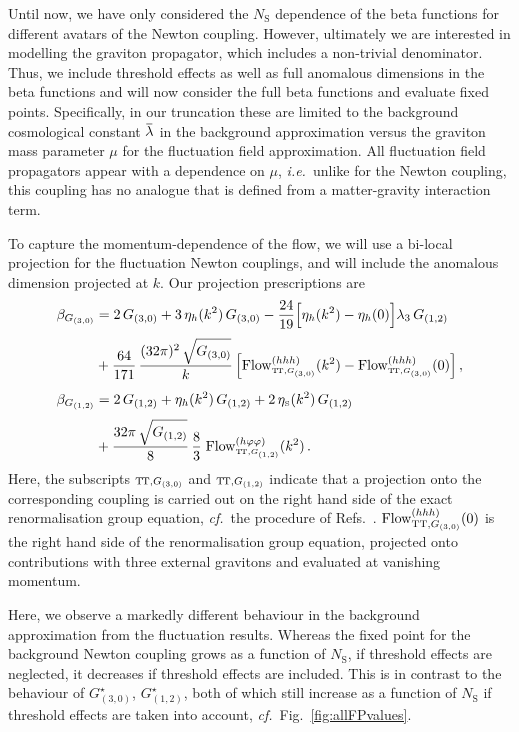 \documentclass[11pt]{book}
\newcommand{\overbar}[1]{\mkern 1.5mu\overline{\mkern-1.5mu#1\mkern-1.5mu}\mkern 1.5mu}
\newcommand\TTspace{ -1pt }
\newcommand\TT{ \scriptscriptstyle{\mathrm{T\hspace{\TTspace}T}} }
\newcommand\etaS{ \eta_{\scriptscriptstyle{\mathrm{S}}} }
\newcommand\NS{ N_{\scriptscriptstyle{\mathrm{S}}} }
\newcommand{\Flow}{\mathrm{Flow}}
\newcommand\ie{\textit{i.e.}\ }
\newcommand\cf{\textit{cf.}\ }
\numberwithin{equation}{chapter}
\begin{document}
Until now, we have only considered the $\NS$ dependence of the beta functions for different
avatars of the Newton coupling. However, ultimately we are interested in modelling the graviton propagator,
which includes a non-trivial denominator.
Thus, we include threshold effects as well as full anomalous dimensions in the beta functions and will
now consider the full beta functions and evaluate fixed points.
Specifically, in our truncation these are limited to the background cosmological constant $\overbar{\lambda}$
in the background approximation versus the graviton mass parameter $\mu$ for the fluctuation field
approximation.
All fluctuation field propagators appear with a dependence on $\mu$, \ie unlike for the Newton coupling,
this coupling has no analogue that is defined from a matter-gravity interaction term.

To capture the momentum-dependence of the flow, we will use a bi-local projection for the fluctuation Newton couplings, and will include the anomalous dimension projected at $k$.
Our projection prescriptions are
\begin{align}
  \beta_{G_{(3,0)}} &= 2 \, G_{(3,0)} + 3  \, \eta_h(k^2)  \, G_{(3,0)}
  - \frac{24}{19}
  \Big[
    \eta_h(k^2)
    -\eta_h(0)
  \Big]
  \lambda_3 \, G_{(1,2)}
  \nonumber \\[3pt]
  &+ \frac{64}{171} \, \frac{ (32\pi)^2 \, \sqrt{ \vphantom{G^2} G_{(3,0)} } }{ k }
  \left[
    \Flow^{(hhh)}_{ \TT, G_{(3,0)} }(k^2)-
    \Flow^{(hhh)}_{ \TT, G_{(3,0)} }(0)
  \right] ,
  \\[5pt]
  \beta_{G_{(1,2)}} &= 2 \, G_{(1,2)} + \eta_h(k^2) \, G_{(1,2)} + 2 \, \etaS(k^2) \, G_{(1,2)}
  \nonumber \\[3pt]
  &+ \frac{ 32 \pi \, \sqrt{ \vphantom{G^2} G_{(1,2)} } }{ 8 } \, \frac{8}{3} \;
  \Flow^{(h\varphi\varphi)}_{ \TT, G_{(1,2)} }(k^2) \,.
\end{align}
Here, the subscripts
$\scriptstyle{\mathrm{T\hspace{\TTspace}T}}, G_{(3,0)}$
and
$\scriptstyle{\mathrm{T\hspace{\TTspace}T}}, G_{(1,2)}$
indicate that a projection onto the corresponding coupling
is carried out on the right hand side of the exact renormalisation group equation,
\cf the procedure of Refs.~\cite{Meibohm:2015twa, Dona:2013qba}.
$\Flow^{(hhh)}_{{\rm TT},G_{(3,0)}}(0)$ is the right hand side of the renormalisation group equation,
projected onto contributions with three external gravitons and evaluated at vanishing momentum.

Here, we observe a markedly different behaviour in the background approximation from the fluctuation results.
Whereas the fixed point for the background Newton coupling grows as a function of $\NS$,
if threshold effects are neglected, it decreases if threshold effects are included.
This is in contrast to the behaviour of $G_{(3,0)}^{\star}$, $G_{(1,2)}^{\star}$,
both of which still increase as a function of $\NS$ if threshold effects are taken into account,
\cf Fig.~\ref{fig:allFPvalues}.
\end{document}
